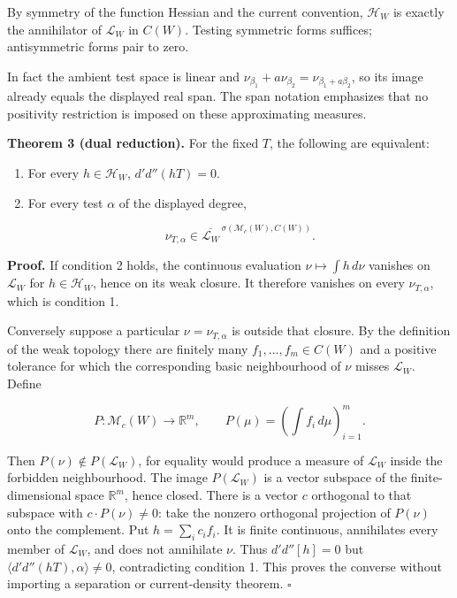 \documentclass[
  11pt,
]{article}
\begin{document}
By symmetry of the function Hessian and the current convention,
\(\mathscr H_W\) is exactly the annihilator of \(\mathscr L_W\) in
\(C(W)\). Testing symmetric forms suffices; antisymmetric forms pair to
zero.

In fact the ambient test space is linear and
\(\nu_{\beta_1}+a\nu_{\beta_2}=\nu_{\beta_1+a\beta_2}\), so its image
already equals the displayed real span. The span notation emphasizes
that no positivity restriction is imposed on these approximating
measures.

\textbf{Theorem 3 (dual reduction).} For the fixed \(T\), the following
are equivalent:

\begin{enumerate}
\def\labelenumi{\arabic{enumi}.}
\item
  For every \(h\in\mathscr H_W\), \(d'd''(hT)=0\).
\item
  For every test \(\alpha\) of the displayed degree,

  \[
  \nu_{T,\alpha}\in
  \overline{\mathscr L_W}^{\,\sigma(\mathscr M_c(W),C(W))}.
  \]
\end{enumerate}

\textbf{Proof.} If condition 2 holds, the continuous evaluation
\(\nu\mapsto\int h\,d\nu\) vanishes on \(\mathscr L_W\) for
\(h\in\mathscr H_W\), hence on its weak closure. It therefore vanishes
on every \(\nu_{T,\alpha}\), which is condition 1.

Conversely suppose a particular \(\nu=\nu_{T,\alpha}\) is outside that
closure. By the definition of the weak topology there are finitely many
\(f_1,\ldots,f_m\in C(W)\) and a positive tolerance for which the
corresponding basic neighbourhood of \(\nu\) misses \(\mathscr L_W\).
Define

\[
P:\mathscr M_c(W)\longrightarrow\mathbb R^m,
\qquad P(\mu)=(\int f_i\,d\mu)_{i=1}^m.
\]

Then \(P(\nu)\notin P(\mathscr L_W)\), for equality would produce a
measure of \(\mathscr L_W\) inside the forbidden neighbourhood. The
image \(P(\mathscr L_W)\) is a vector subspace of the finite-dimensional
space \(\mathbb R^m\), hence closed. There is a vector \(c\) orthogonal
to that subspace with \(c\cdot P(\nu)\ne0\): take the nonzero orthogonal
projection of \(P(\nu)\) onto the complement. Put \(h=\sum_i c_i f_i\).
It is finite continuous, annihilates every member of \(\mathscr L_W\),
and does not annihilate \(\nu\). Thus \(d'd''[h]=0\) but
\(\langle d'd''(hT),\alpha\rangle\ne0\), contradicting condition 1. This
proves the converse without importing a separation or current-density
theorem. \(\square\)
\end{document}
